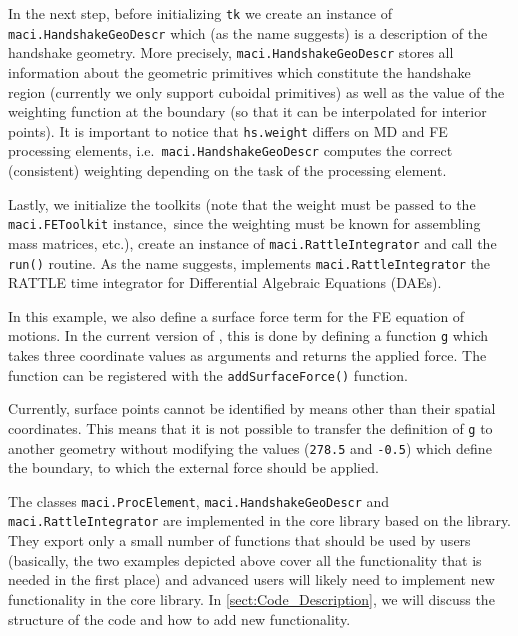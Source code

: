In the next step, before initializing \lstinline[style=PYTHON]|tk| we create an instance of \lstinline[style=PYTHON]|maci.HandshakeGeoDescr| which (as the name suggests) is a description of the handshake geometry. More precisely, \lstinline[style=PYTHON]|maci.HandshakeGeoDescr| stores all information about the geometric primitives which constitute the handshake region (currently we only support cuboidal primitives) as well as the value of the weighting function at the boundary (so that it can be interpolated for interior points). It is important to notice that \lstinline[style=PYTHON]|hs.weight| differs on MD and FE processing elements, i.e.~\lstinline[style=PYTHON]|maci.HandshakeGeoDescr| computes the correct (consistent) weighting depending on the task of the processing element.\newline

Lastly, we initialize the toolkits (note that the weight must be passed to the \lstinline[style=PYTHON]|maci.FEToolkit| instance,~since the weighting must be known for assembling mass matrices, etc.), create an instance of \lstinline[style=PYTHON]|maci.RattleIntegrator| and call the \lstinline[style=PYTHON]|run()| routine. As the name suggests, implements \lstinline[style=PYTHON]|maci.RattleIntegrator| the RATTLE time integrator for Differential Algebraic Equations (DAEs).\newline

In this example, we also define a surface force term for the FE equation of motions. In the current version of \MACI, this is done by defining a function \lstinline[style=PYTHON]|g| which takes three coordinate values as arguments and returns the applied force. The function can be registered with the \lstinline[style=PYTHON]|addSurfaceForce()| function.

Currently, surface points cannot be identified by means other than their spatial coordinates. This means that it is not possible to transfer the definition of \lstinline[style=PYTHON]|g| to another geometry without modifying the values (\lstinline[style=PYTHON]|278.5| and \lstinline[style=PYTHON]|-0.5|) which define the boundary, to which the external force should be applied.\newline

The classes \lstinline[style=PYTHON]|maci.ProcElement|, \lstinline[style=PYTHON]|maci.HandshakeGeoDescr| and \lstinline[style=PYTHON]|maci.RattleIntegrator| are implemented in the core library based on the \MACI \CPP library. They export only a small number of functions that should be used by users (basically, the two examples depicted above cover all the functionality that is needed in the first place) and advanced users will likely need to implement new functionality in the \MACI core library. In \ref{sect:Code_Description}, we will discuss the structure of the code and how to add new functionality.
